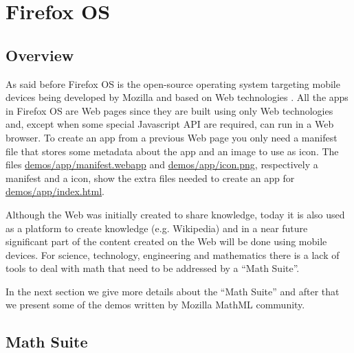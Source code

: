 \section{Firefox OS}
\label{sec:firefoxOS}

\subsection{Overview}

As said before
Firefox OS is the open-source operating system targeting mobile devices being
developed by Mozilla and based on Web technologies \cite{MozillaFirefoxOS}.
All the apps in Firefox OS
are Web pages since they are built using only Web technologies and, except when
some special Javascript API are required, can run in a Web browser.
To create an app from a previous Web page you only need a manifest
file that stores some metadata about the app and an image to use as icon. The
files
\href{http://fred-wang.github.io/MathUI2014/demos/app/manifest.webapp}{demos/app/manifest.webapp}
and
\href{http://fred-wang.github.io/MathUI2014/demos/app/icon.png}{demos/app/icon.png},
respectively a manifest and a icon,
show the extra files needed to create an app for
\href{http://fred-wang.github.io/MathUI2014/demos/app/index.html}{demos/app/index.html}.

Although the Web was initially created to share knowledge, today it is also used
as a platform to create knowledge (e.g. Wikipedia) and in a near future
significant part of the content created on the Web will be done using mobile
devices. For science, technology, engineering and mathematics there is a lack of
tools to deal with math that need to be addressed by a ``Math Suite''.

In the next section we give more details about the ``Math Suite'' and
after that we present some of the demos written by Mozilla MathML community.

\subsection{Math Suite}

